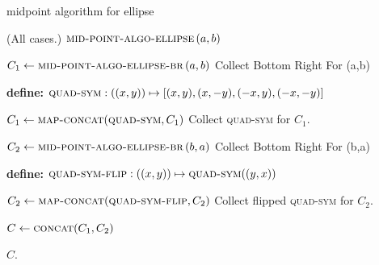 \documentclass[aspectratio=169,xcolor={dvipsnames,svgnames}]{beamer}
\begin{document}
\begin{frame}[label={sec:org7152516}]{midpoint algorithm for ellipse}
\begin{algorithm}[H]
  \caption{Mid Point Algorithm for Ellispe (Collect
    Symmetric Points)}
  \DontPrintSemicolon

  \Fn(\hfill {\scriptsize All cases.}){\upshape
    $\textsc{mid-point-algo-ellipse}\, (a,b)$}{


    $C_1\gets\textsc{mid-point-algo-ellipse-br}\, (a,b)$
    \hfill {\scriptsize Collect Bottom Right For (a,b)}

    \textbf{define:}  $\textsc{quad-sym}:((x,y))
    \mapsto [(x,y), (x,-y), (-x,y), (-x,-y)]$

    $C_1\gets\textsc{map-concat}(\textsc{quad-sym},C_1)$
    \hfill {\scriptsize Collect \textsc{quad-sym} for
      $C_1$.}

    $C_2\gets\textsc{mid-point-algo-ellipse-br}\, (b,a)$
    \hfill {\scriptsize Collect Bottom Right For (b,a)}

    \textbf{define:}  $\textsc{quad-sym-flip}:((x,y))
    \mapsto \textsc{quad-sym}((y,x))$

    $C_2\gets\textsc{map-concat}(\textsc{quad-sym-flip},C_2)$
    \hfill {\scriptsize Collect flipped
      \textsc{quad-sym} for $C_2$.}

    $C\gets\textsc{concat}(C_1, C_2)$

    \Return $C$.

  }    
\end{algorithm}
\end{frame}
\end{document}
